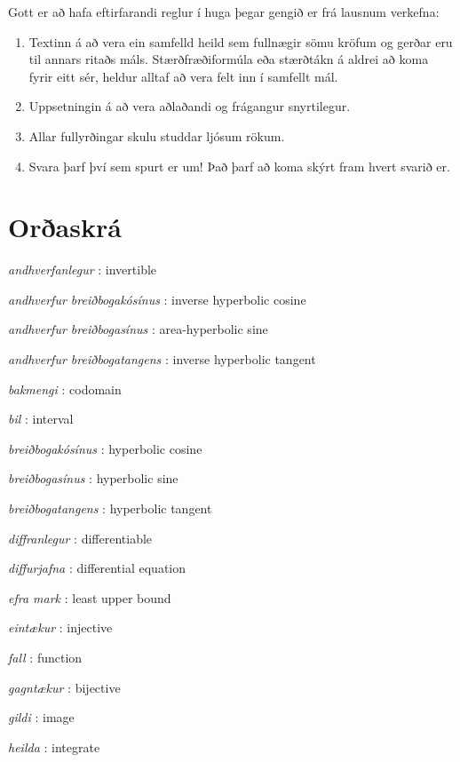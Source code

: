 \documentclass[a4paper,10pt,icelandic]{sphinxmanual}
\begin{document}
Gott er að hafa eftirfarandi reglur í huga þegar gengið er frá lausnum
verkefna:
\begin{enumerate}
\item {} 
Textinn á að vera ein samfelld heild sem fullnægir sömu kröfum og
gerðar eru til annars ritaðs máls. Stærðfræðiformúla eða stærðtákn á
aldrei að koma fyrir eitt sér, heldur alltaf að vera felt inn í samfellt
mál.

\item {} 
Uppsetningin á að vera aðlaðandi og frágangur snyrtilegur.

\item {} 
Allar fullyrðingar skulu studdar ljósum rökum.

\item {} 
Svara þarf því sem spurt er um! Það þarf að koma skýrt fram hvert
svarið er.

\end{enumerate}




\chapter{Orðaskrá}
\label{ordaskra:oraskra}\label{ordaskra::doc}
\emph{andhverfanlegur} : invertible

\emph{andhverfur breiðbogakósínus} : inverse hyperbolic cosine


\emph{andhverfur breiðbogasínus} : area-hyperbolic sine

\emph{andhverfur breiðbogatangens} : inverse hyperbolic tangent


\emph{bakmengi} : codomain

\emph{bil} : interval


\emph{breiðbogakósínus} : hyperbolic cosine


\emph{breiðbogasínus} : hyperbolic sine


\emph{breiðbogatangens} : hyperbolic tangent


\emph{diffranlegur} : differentiable


\emph{diffurjafna} : differential equation


\emph{efra mark} : least upper bound

\emph{eintækur} : injective

\emph{fall} : function


\emph{gagntækur} : bijective

\emph{gildi} : image

\emph{heilda} : integrate
\end{document}
